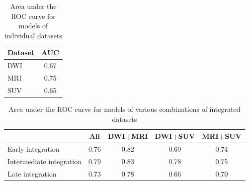 \begin{table}
	\centering
	\begin{tabular}{lc}
		\toprule
		Dataset & AUC \\
		\midrule
		DWI & 0.67 \\
		MRI & 0.75 \\
		SUV & 0.65 \\
		\bottomrule
	\end{tabular}
	\caption{Area under the ROC curve for models of individual datasets}
	\label{tab:evaluation-auc-individual}
\end{table}
\begin{table}
	\centering
	\begin{tabular}{lcccc}
		\toprule
	 & All & DWI+MRI & DWI+SUV & MRI+SUV \\
		\midrule
		Early integration & 0.76 & 0.82 & 0.69 & 0.74 \\
		Intermediate integration & 0.79 & 0.83 & 0.78 & 0.75 \\
		Late integration & 0.73 & 0.78 & 0.66 & 0.70 \\
		\bottomrule
	\end{tabular}
	\caption{Area under the ROC curve for models of various combinations of integrated datasets}
	\label{tab:evaluation-auc-integrated}
\end{table}


